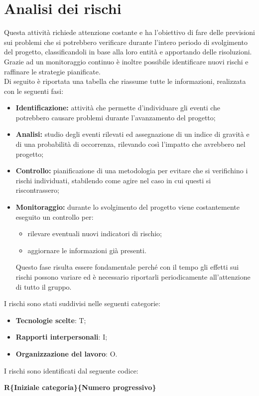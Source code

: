 \section{Analisi dei rischi}
Questa attività richiede attenzione costante e ha l'obiettivo di fare delle previsioni sui problemi che si potrebbero verificare durante l'intero periodo di svolgimento del progetto, classificandoli in base alla loro entità e apportando delle risoluzioni.\\ Grazie ad un monitoraggio continuo è inoltre possibile identificare nuovi rischi e raffinare le strategie pianificate.\\
Di seguito è riportata una tabella che riassume tutte le informazioni, realizzata con le seguenti fasi:
\begin{itemize}
\item \textbf{Identificazione:} attività che permette d'individuare gli eventi che potrebbero causare problemi durante l'avanzamento del progetto;
\item \textbf{Analisi:} studio degli eventi rilevati ed assegnazione di un indice di gravità e di una probabilità di occorrenza, rilevando così l'impatto che avrebbero nel progetto;
\item \textbf{Controllo:} pianificazione di una metodologia per evitare che
si verifichino i rischi individuati, stabilendo come agire nel caso in cui questi si riscontrassero;
\item \textbf{Monitoraggio:} durante lo svolgimento del progetto viene costantemente eseguito un controllo per:
	\begin{itemize}
		\item rilevare eventuali nuovi indicatori di rischio;
		\item aggiornare le informazioni già presenti.
	\end{itemize}
Questo fase risulta essere fondamentale perché con il tempo gli effetti sui rischi possono variare ed è necessario riportarli periodicamente all'attenzione di tutto il gruppo.
\end{itemize}
I rischi sono stati suddivisi nelle seguenti categorie:
\begin{itemize}
\item \textbf{Tecnologie scelte}: T;
\item \textbf{Rapporti interpersonali}: I;
\item \textbf{Organizzazione del lavoro}: O.
\end{itemize}
I rischi sono identificati dal seguente codice:
\begin{center}
	\textbf{R\{Iniziale categoria\}\{Numero progressivo\}}
\end{center}
\newlength\colA\setlength\colA{2.5cm}
\newlength\colB\setlength\colB{5cm}
\newlength\colC\setlength\colC{3cm}
\newlength\total\setlength\total{\dimexpr\colA+\colB+\colB+\colC+6\tabcolsep\relax}
\renewcommand{\arraystretch}{2}%
